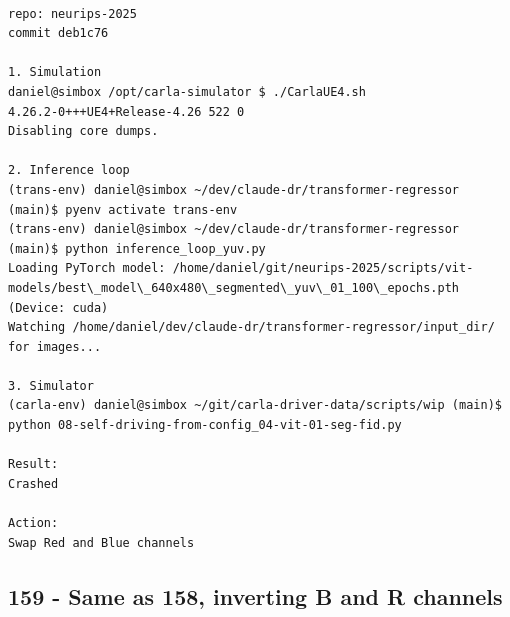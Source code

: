\begin{verbatim}

repo: neurips-2025
commit deb1c76

1. Simulation
daniel@simbox /opt/carla-simulator $ ./CarlaUE4.sh 
4.26.2-0+++UE4+Release-4.26 522 0
Disabling core dumps.

2. Inference loop
(trans-env) daniel@simbox ~/dev/claude-dr/transformer-regressor (main)$ pyenv activate trans-env
(trans-env) daniel@simbox ~/dev/claude-dr/transformer-regressor (main)$ python inference_loop_yuv.py 
Loading PyTorch model: /home/daniel/git/neurips-2025/scripts/vit-models/best\_model\_640x480\_segmented\_yuv\_01_100\_epochs.pth (Device: cuda)
Watching /home/daniel/dev/claude-dr/transformer-regressor/input_dir/ for images...

3. Simulator
(carla-env) daniel@simbox ~/git/carla-driver-data/scripts/wip (main)$ python 08-self-driving-from-config_04-vit-01-seg-fid.py 

Result:
Crashed

Action:
Swap Red and Blue channels

\end{verbatim}

\subsection{159 - Same as 158, inverting B and R channels}
\label{app_res:159}

